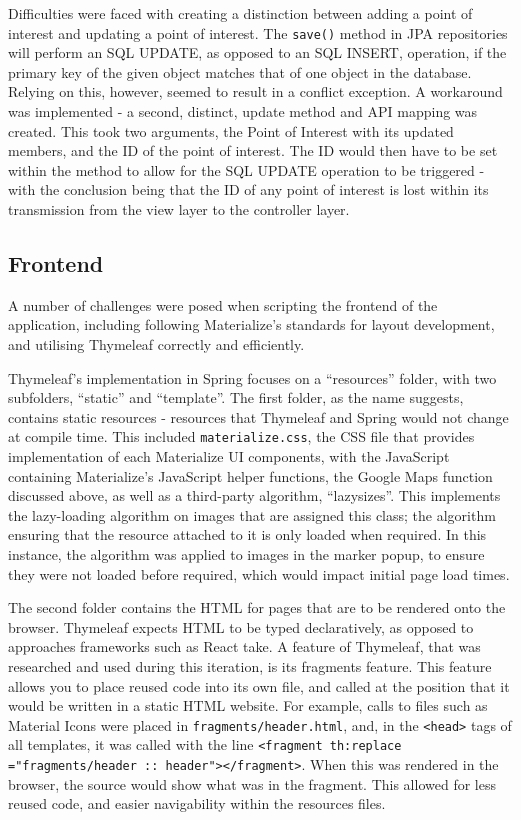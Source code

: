 Difficulties were faced with creating a distinction between adding a point of interest and updating a point of interest. The \texttt{save()} method in JPA repositories will perform an SQL UPDATE, as opposed to an SQL INSERT, operation, if the primary key of the given object matches that of one object in the database. Relying on this, however, seemed to result in a conflict exception. A workaround was implemented - a second, distinct, update method and API mapping was created. This took two arguments, the Point of Interest with its updated members, and the ID of the point of interest. The ID would then have to be set within the method to allow for the SQL UPDATE operation to be triggered - with the conclusion being that the ID of any point of interest is lost within its transmission from the view layer to the controller layer.

\subsection{Frontend}

A number of challenges were posed when scripting the frontend of the application, including following Materialize's standards for layout development, and utilising Thymeleaf correctly and efficiently.

Thymeleaf's implementation in Spring focuses on a ``resources'' folder, with two subfolders, ``static'' and ``template''. The first folder, as the name suggests, contains static resources - resources that Thymeleaf and Spring would not change at compile time. This included \texttt{materialize.css}, the CSS file that provides implementation of each Materialize UI components, with the JavaScript containing Materialize's JavaScript helper functions, the Google Maps function discussed above, as well as a third-party algorithm, ``lazysizes''\cite{lazysizes}. This implements the lazy-loading algorithm on images that are assigned this class; the algorithm ensuring that the resource attached to it is only loaded when required. In this instance, the algorithm was applied to images in the marker popup, to ensure they were not loaded before required, which would impact initial page load times.

The second folder contains the HTML for pages that are to be rendered onto the browser. Thymeleaf expects HTML to be typed declaratively, as opposed to approaches frameworks such as React take. A feature of Thymeleaf, that was researched and used during this iteration, is its fragments feature. This feature allows you to place reused code into its own file, and called at the position that it would be written in a static HTML website. For example, calls to files such as Material Icons were placed in \texttt{fragments/header.html}, and, in the \texttt{<head>} tags of all templates, it was called with the line \texttt{<fragment th:replace
="fragments/header :: header"></fragment>}. When this was rendered in the browser, the source would show what was in the fragment. This allowed for less reused code, and easier navigability within the resources files.


